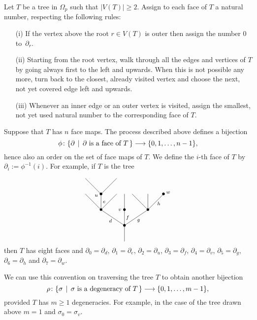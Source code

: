 \documentclass[a4paper]{amsart}
\theoremstyle{plain}
\theoremstyle{definition}
\theoremstyle{remark}
\newcommand{\rpd}{\Omega_p}
\newcommand{\To}{\longrightarrow}
\numberwithin{equation}{section}
\numberwithin{figure}{section}
\begin{document}
Let $T$ be a tree in $\rpd$ such that $|V(T)|\ge 2$. Assign to each face of $T$ a natural number, respecting the following rules:
\begin{itemize}
\item[{\rm (i)}] If the vertex above the root $r\in V(T)$ is outer then assign the number 0 to~$\partial_r$.
\item[{\rm (ii)}] Starting from the root vertex, walk through all the edges and  vertices of $T$ by going always first to the left and upwards. When this is not possible any more, turn back to the closest, already visited vertex and choose the next, not yet covered edge left and upwards.
\item[{\rm (iii)}] Whenever an inner edge or an outer vertex is visited, assign the smallest, not yet used natural number to the corresponding face of $T$.
\end{itemize}
Suppose that $T$ has $n$ face maps. The process described above defines a bijection
$$
\phi\colon \{\partial\,\mid\, \partial \textnormal{ is a face of $T$}\,\}\To \{0,1,\ldots,n-1\},
$$
hence also an order on the set of face maps of $T$. We define the $i$-th face of $T$ by $\partial_i:=\phi^{-1}(i)$.
For example, if $T$ is the tree

\begin{equation}\label{eq:tree1}
\xy<0.08cm,0cm>:
(25,-20)*=0{}="1";
(25,-10)*=0{\bullet}="2";
(10,0)*=0{\bullet}="3";
(25,0)*=0{\bullet}="4";
(40,0)*=0{\bullet}="5";
(0,10)*=0{}="6";
(10,10)*=0{\bullet}="7";
(20,10)*=0{}="8";
(25,10)*=0{}="9";
(30,10)*=0{}="10";
(40,10)*=0{}="11";
(50,10)*=0{\bullet}="12";
(0,20)*=0{}="13";
(20,20)*=0{}="14";
(7,9)*{\scriptstyle u};
(22,0)*{\scriptstyle v};
(53,11)*{\scriptstyle w};
(16,-7)*{\scriptstyle d};
(12,5)*{\scriptstyle e};
(27,-5)*{\scriptstyle f};
(34,-7)*{\scriptstyle g};
(47,4)*{\scriptstyle h};
"1";"2" **\dir{-};
"2";"3" **\dir{-};
"2";"4" **\dir{-};
"2";"5" **\dir{-};
"3";"6" **\dir{-};
"3";"7" **\dir{-};
"3";"8" **\dir{-};
"4";"9" **\dir{-};
"5";"10" **\dir{-};
"5";"11" **\dir{-};
"5";"12" **\dir{-};
"7";"13" **\dir{-};
"7";"14" **\dir{-};
\endxy
\end{equation}
then $T$ has eight faces and $\partial_0=\partial_d$, $\partial_1=\partial_e$, $\partial_2=\partial_u$, $\partial_3=\partial_f$, $\partial_4=\partial_v$, $\partial_5=\partial_g$, $\partial_6=\partial_h$ and $\partial_7=\partial_w$.

We can use this convention on traversing the tree $T$ to obtain another bijection
$$
\rho\colon\{\sigma\,\mid\, \sigma \textnormal{ is a degeneracy of $T$}\, \}\To\{0,1,\ldots, m-1\},
$$
provided $T$ has $m\ge 1$ degeneracies. For example, in the case of the tree drawn above $m=1$ and $\sigma_0=\sigma_v$.
\end{document}
